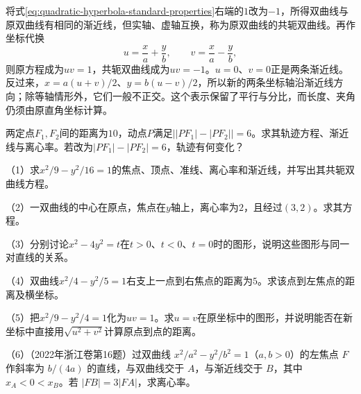 将式\eqref{eq:quadratic-hyperbola-standard-properties}右端的\(1\)改为\(-1\)，所得双曲线与原双曲线有相同的渐近线，但实轴、虚轴互换，称为原双曲线的{\heiti{}共轭双曲线}。再作坐标代换
\begin{equation}\label{eq:quadratic-asymptotic-coordinates}
    u=\frac xa+\frac yb ,\qquad v=\frac xa-\frac yb ,
\end{equation}
则原方程成为\(uv=1\)，共轭双曲线成为\(uv=-1\)。\(u=0\)、\(v=0\)正是两条渐近线。反过来，\(x=a(u+v)/2\)、\(y=b(u-v)/2\)，所以新的两条坐标轴沿渐近线方向；除等轴情形外，它们一般不正交。这个表示保留了平行与分比，而长度、夹角仍须由原直角坐标计算。

\begin{samepage}
\begin{example}
两定点\(F_1,F_2\)间的距离为\(10\)，动点\(P\)满足\(\bigl||PF_1|-|PF_2|\bigr|=6\)。求其轨迹方程、渐近线与离心率。若改为\(|PF_1|-|PF_2|=6\)，轨迹有何变化？
\end{example}
\end{samepage}

\begin{exercise}
\mbox{}\par\nobreak

\begin{samepage}
（1）求\(x^2/9-y^2/16=1\)的焦点、顶点、准线、离心率和渐近线，并写出其共轭双曲线方程。
\par
\end{samepage}

\begin{samepage}
（2）一双曲线的中心在原点，焦点在\(y\)轴上，离心率为\(2\)，且经过\((3,2)\)。求其方程。
\par
\end{samepage}

\begin{samepage}
（3）分别讨论\(x^2-4y^2=t\)在\(t>0\)、\(t<0\)、\(t=0\)时的图形，说明这些图形与同一对直线的关系。
\par
\end{samepage}

\begin{samepage}
（4）双曲线\(x^2/4-y^2/5=1\)右支上一点到右焦点的距离为\(5\)。求该点到左焦点的距离及横坐标。
\par
\end{samepage}

\begin{samepage}
（5）把\(x^2/9-y^2/4=1\)化为\(uv=1\)。求\(u=v\)在原坐标中的图形，并说明能否在新坐标中直接用\(\sqrt{u^2+v^2}\)计算原点到点的距离。
\par
\end{samepage}
\begin{samepage}
（6）（2022年浙江卷第16题）过双曲线 \(x^2/a^2-y^2/b^2=1\)（\(a,b>0\)）的左焦点 \(F\) 作斜率为 \(b/(4a)\) 的直线，与双曲线交于 \(A\)，与渐近线交于 \(B\)，其中 \(x_A<0<x_B\)。若 \(|FB|=3|FA|\)，求离心率。
\par\end{samepage}
\end{exercise}

